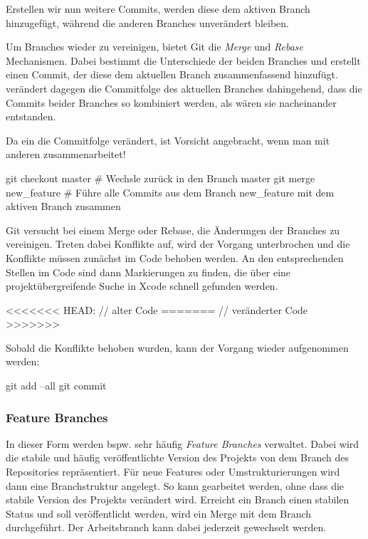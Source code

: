 \documentclass[parskip=half, final]{scrreprt}
\begin{document}
Erstellen wir nun weitere Commits, werden diese dem aktiven Branch hinzugefügt, während die anderen Branches unverändert bleiben. 

Um Branches wieder zu vereinigen, bietet Git die \emph{Merge} und \emph{Rebase} Mechanismen. Dabei bestimmt  die Unterschiede der beiden Branches und erstellt einen Commit, der diese dem aktuellen Branch zusammenfassend hinzufügt.  verändert dagegen die Commitfolge des aktuellen Branches dahingehend, dass die Commits beider Branches so kombiniert werden, als wären sie nacheinander entstanden.

 Da ein  die Commitfolge verändert, ist Vorsicht angebracht, wenn man mit anderen zusammenarbeitet!

\begin{shcode}
git checkout master # Wechsle zurück in den Branch master
git merge new_feature # Führe alle Commits aus dem Branch new_feature mit dem aktiven Branch zusammen
\end{shcode}

Git versucht bei einem Merge oder Rebase, die Änderungen der Branches zu vereinigen. Treten dabei Konflikte auf, wird der Vorgang unterbrochen und die Konflikte müssen zunächst im Code behoben werden. An den entsprechenden Stellen im Code sind dann Markierungen zu finden, die über eine projektübergreifende Suche in Xcode schnell gefunden werden.

\begin{objccode}
<<<<<<< HEAD:
// alter Code
=======
// veränderter Code
>>>>>>>
\end{objccode}

Sobald die Konflikte behoben wurden, kann der Vorgang wieder aufgenommen werden:

\begin{shcode}
git add --all
git commit
\end{shcode}

\subsubsection{Feature Branches}

In dieser Form werden bspw. sehr häufig \emph{Feature Branches} verwaltet. Dabei wird die stabile und häufig veröffentlichte Version des Projekts von dem  Branch des Repositories repräsentiert. Für neue Features oder Umstrukturierungen wird dann eine Branchstruktur angelegt. So kann gearbeitet werden, ohne dass die stabile Version des Projekts verändert wird. Erreicht ein Branch einen stabilen Status und soll veröffentlicht werden, wird ein Merge mit dem  Branch durchgeführt. Der Arbeitsbranch kann dabei jederzeit gewechselt werden.
\end{document}
